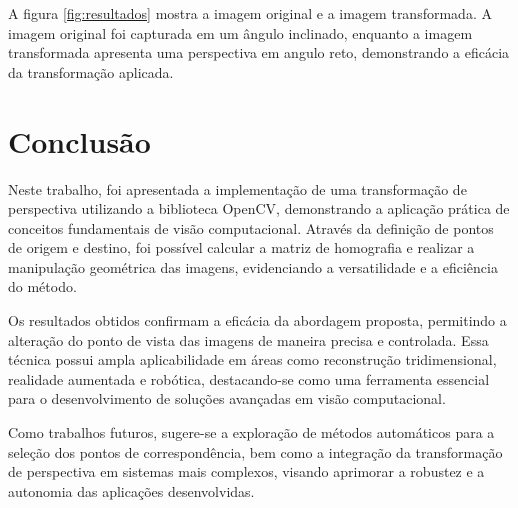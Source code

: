 \documentclass[sigconf,nonacm]{acmart}
\begin{document}
A figura \ref{fig:resultados} mostra a imagem original e a imagem transformada. A imagem original foi capturada em um ângulo inclinado, enquanto a imagem transformada apresenta uma perspectiva em angulo reto, demonstrando a eficácia da transformação aplicada.




\section{Conclusão}

Neste trabalho, foi apresentada a implementação de uma transformação de perspectiva utilizando a biblioteca OpenCV, demonstrando a aplicação prática de conceitos fundamentais de visão computacional. Através da definição de pontos de origem e destino, foi possível calcular a matriz de homografia e realizar a manipulação geométrica das imagens, evidenciando a versatilidade e a eficiência do método.

Os resultados obtidos confirmam a eficácia da abordagem proposta, permitindo a alteração do ponto de vista das imagens de maneira precisa e controlada. Essa técnica possui ampla aplicabilidade em áreas como reconstrução tridimensional, realidade aumentada e robótica, destacando-se como uma ferramenta essencial para o desenvolvimento de soluções avançadas em visão computacional.

Como trabalhos futuros, sugere-se a exploração de métodos automáticos para a seleção dos pontos de correspondência, bem como a integração da transformação de perspectiva em sistemas mais complexos, visando aprimorar a robustez e a autonomia das aplicações desenvolvidas.


\end{document}
